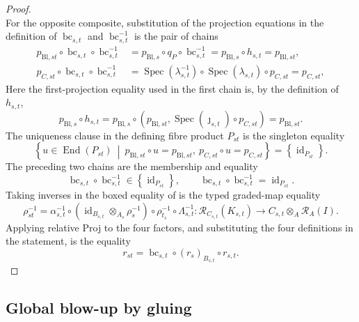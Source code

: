 \begin{proof}
\[  \]
  For the opposite composite, substitution of the projection equations in
  the definition of $\operatorname{bc}_{s,t}$ and
  $\operatorname{bc}_{s,t}^{-1}$ is the pair of chains
  \[
  \begin{aligned}
    p_{\mathrm{Bl},st}\circ\operatorname{bc}_{s,t}\circ
      \operatorname{bc}_{s,t}^{-1}
      &=p_{\mathrm{Bl},s}\circ q_P\circ
        \operatorname{bc}_{s,t}^{-1}
       =p_{\mathrm{Bl},s}\circ h_{s,t}
       =p_{\mathrm{Bl},st},\\
    p_{C,st}\circ\operatorname{bc}_{s,t}\circ
      \operatorname{bc}_{s,t}^{-1}
      &=\operatorname{Spec}(\lambda_{s,t}^{-1})\circ
        \operatorname{Spec}(\lambda_{s,t})\circ p_{C,st}
       =p_{C,st},
  \end{aligned}
  \]
  Here the first-projection equality used in the first chain is, by the
  definition of $h_{s,t}$,
  \[
    p_{\mathrm{Bl},s}\circ h_{s,t}
      =p_{\mathrm{Bl},s}\circ
        (p_{\mathrm{Bl},st},
          \operatorname{Spec}(\jmath_{s,t})\circ p_{C,st})
      =p_{\mathrm{Bl},st}.
  \]
  The uniqueness clause in the
  defining fibre product $P_{st}$ is the singleton equality
  \[
    \left\{u\in\operatorname{End}(P_{st})\ \middle|\
      p_{\mathrm{Bl},st}\circ u=p_{\mathrm{Bl},st},\ 
      p_{C,st}\circ u=p_{C,st}\right\}
      =\left\{\operatorname{id}_{P_{st}}\right\}.
  \]
  The preceding two chains are the membership and equality
  \[
    \operatorname{bc}_{s,t}\circ\operatorname{bc}_{s,t}^{-1}
      \in\left\{\operatorname{id}_{P_{st}}\right\},\qquad
    \operatorname{bc}_{s,t}\circ\operatorname{bc}_{s,t}^{-1}
      =\operatorname{id}_{P_{st}}.                               \tag{BC2}
  \]
  Taking inverses in the boxed equality of
   is the typed graded-map equality
  \[
    \rho_{st}^{-1}
      =\alpha_{s,t}^{-1}\circ
        (\operatorname{id}_{B_{s,t}}\otimes_{A_s}\rho_s^{-1})\circ
        \rho_{t_s}^{-1}\circ\Lambda_{s,t}^{-1}
      \colon
      \mathcal R_{C_{s,t}}(K_{s,t})
      \longrightarrow C_{s,t}\otimes_A\mathcal R_A(I).
  \]
  Applying relative Proj to the four factors, and substituting the four
  definitions in the statement, is the equality
  \[
    r_{st}
      =\operatorname{bc}_{s,t}\circ(r_s)_{B_{s,t}}\circ r_{s,t}.
  \]
\end{proof}

\subsection{Global blow-up by gluing}

